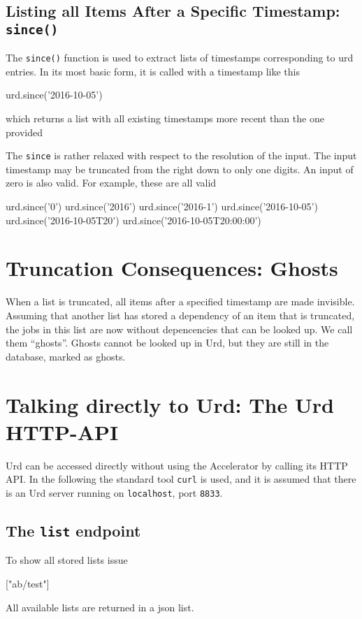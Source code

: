 \subsection{Listing all Items After a Specific Timestamp:  \texttt{since()}}
The \texttt{since()} function is used to extract lists of timestamps
corresponding to urd entries.  In its most basic form, it is called
with a timestamp like this
\begin{python}
urd.since('2016-10-05')
\end{python}
which returns a list with all existing timestamps more recent than the
one provided
\begin{shell}
['2016-10-06', '2016-10-07', '2016-10-08', '2016-10-09', '2016-10-09T20']
\end{shell}
The \texttt{since} is rather relaxed with respect to the resolution of
the input.  The input timestamp may be truncated from the right down
to only one digits.  An input of zero is also valid.  For example,
these are all valid
\begin{python}
urd.since('0')
urd.since('2016')
urd.since('2016-1')
urd.since('2016-10-05')
urd.since('2016-10-05T20')
urd.since('2016-10-05T20:00:00')
\end{python}



\section{Truncation Consequences:  Ghosts}
When a list is truncated, all items after a specified timestamp are
made invisible.  Assuming that another list has stored a dependency of
an item that is truncated, the jobs in this list are now without
depencencies that can be looked up.  We call them ``ghosts''.  Ghosts
cannot be looked up in Urd, but they are still in the database, marked
as ghosts.



\clearpage
\section{Talking directly to Urd:  The Urd HTTP-API}

Urd can be accessed directly without using the Accelerator by calling
its HTTP API.  In the following the standard tool \texttt{curl} is
used, and it is assumed that there is an Urd server running
on \texttt{localhost}, port \texttt{8833}.


\subsection{The \texttt{list} endpoint}
To show all stored lists issue
\begin{shell}
["ab/test"]
\end{shell}
All available lists are returned in a json list.


